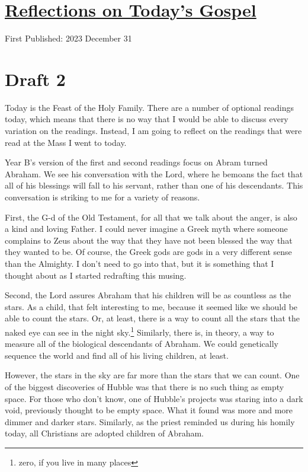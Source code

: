 \documentclass[12pt]{article}[titlepage]
\newcommand{\1}{\={a}}
\newcommand{\2}{\={e}}
\newcommand{\3}{\={\i}}
\newcommand{\4}{\=o}
\newcommand{\5}{\=u}
\newcommand{\6}{\={A}}
\renewcommand{\,}{\textsuperscript{,}}
\begin{document}
\doublespacing
\section{\href{reflections-on-readings-holy-family-b-23.html}{Reflections on Today's Gospel}}
First Published: 2023 December 31

\section{Draft 2}
Today is the Feast of the Holy Family.
There are a number of optional readings today, which means that there is no way that I would be able to discuss every variation on the readings.
Instead, I am going to reflect on the readings that were read at the Mass I went to today.

Year B's version of the first and second readings focus on Abram turned Abraham.
We see his conversation with the Lord, where he bemoans the fact that all of his blessings will fall to his servant, rather than one of his descendants.
This conversation is striking to me for a variety of reasons.

First, the G-d of the Old Testament, for all that we talk about the anger, is also a kind and loving Father.
I could never imagine a Greek myth where someone complains to Zeus about the way that they have not been blessed the way that they wanted to be.
Of course, the Greek gods are gods in a very different sense than the Almighty.
I don't need to go into that, but it is something that I thought about as I started redrafting this musing.

Second, the Lord assures Abraham that his children will be as countless as the stars.
As a child, that felt interesting to me, because it seemed like we should be able to count the stars.
Or, at least, there is a way to count all the stars that the naked eye can see in the night sky.\footnote{zero, if you live in many places}
Similarly, there is, in theory, a way to measure all of the biological descendants of Abraham.
We could genetically sequence the world and find all of his living children, at least.

However, the stars in the sky are far more than the stars that we can count.
One of the biggest discoveries of Hubble was that there is no such thing as empty space.
For those who don't know, one of Hubble's projects was staring into a dark void, previously thought to be empty space.
What it found was more and more dimmer and darker stars.
Similarly, as the priest reminded us during his homily today, all Christians are adopted children of Abraham.
\end{document}
